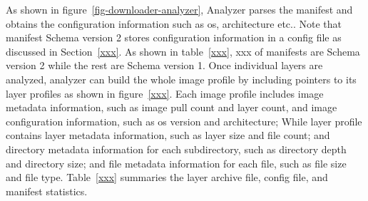 As shown in figure~\ref{fig-downloader-analyzer}, Analyzer parses the manifest and obtains the configuration information such as os, architecture etc..
%
Note that manifest Schema version 2 stores configuration information in a config file as discussed in Section~\ref{xxx}.
%
As shown in table~\ref{xxx}, xxx of manifests are Schema version 2 while the rest are Schema version 1. 
%
Once individual layers are analyzed, analyzer can build the whole image profile by including pointers to its layer profiles as shown in figure~\ref{xxx}. Each image profile includes image metadata information, such as image pull count and layer count, and image configuration information, such as os version and architecture; While layer profile contains layer metadata information, such as layer size and file count; and directory metadata information for each subdirectory, such as directory depth and directory size; and file metadata information for each file, such as file size and file type.
%
Table~\ref{xxx} summaries the layer archive file, config file, and manifest statistics.



